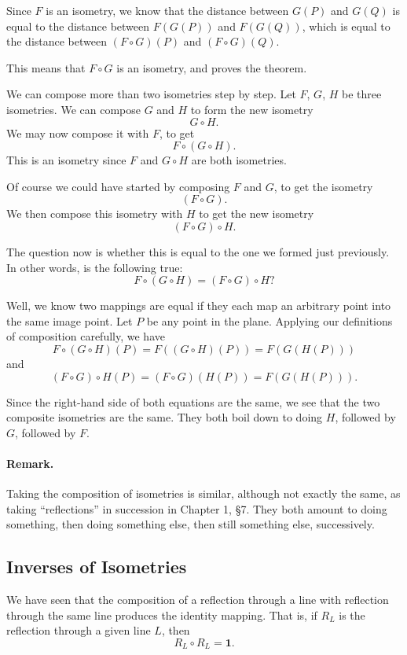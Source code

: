 \documentclass[12pt]{book} %
\begin{document}
\begin{ExerciseList}
Since $F$ is an isometry, we know that the distance between $G(P)$ and $G(Q)$ is equal to the distance between $F(G(P))$ and $F(G(Q))$, which is equal to the distance between $(F\circ G)(P)$ and $(F\circ G)(Q)$.

This means that $F\circ G$ is an isometry, and proves the theorem.

We can compose more than two isometries step by step. Let $F$, $G$, $H$ be three isometries. We can compose $G$ and $H$ to form the new isometry
\[
G\circ H.
\]
We may now compose it with $F$, to get
\[
F\circ (G\circ H).
\]
This is an isometry since $F$ and $G\circ H$ are both isometries.

Of course we could have started by composing $F$ and $G$, to get the isometry
\[
(F\circ G).
\]
We then compose this isometry with $H$ to get the new isometry
\[
(F\circ G)\circ H.
\]

The question now is whether this is equal to the one we formed just previously. In other words, is the following true:
\[
F\circ (G\circ H)=(F\circ G)\circ H?
\]

Well, we know two mappings are equal if they each map an arbitrary point into the same image point. Let $P$ be any point in the plane. Applying our definitions of composition carefully, we have
\[
F\circ (G\circ H)(P)=F((G\circ H)(P))=F(G(H(P)))
\]
and
\[
(F\circ G)\circ H(P)=(F\circ G)(H(P))=F(G(H(P))).
\]

Since the right-hand side of both equations are the same, we see that the two composite isometries are the same. They both boil down to doing $H$, followed by $G$, followed by $F$.

\paragraph{Remark.}
Taking the composition of isometries is similar, although not exactly the same, as taking ``reflections'' in succession in Chapter 1, \S7. They both amount to doing something, then doing something else, then still something else, successively.

\subsection*{Inverses of Isometries}

We have seen that the composition of a reflection through a line with reflection through the same line produces the identity mapping. That is, if $R_L$ is the reflection through a given line $L$, then
\[
R_L\circ R_L=\mathbf{1}.
\]


\end{ExerciseList}
\end{document}
